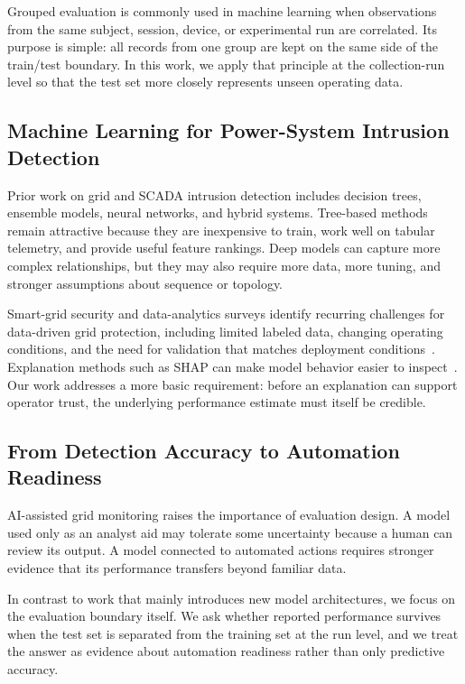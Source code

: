\documentclass[conference,a4paper]{IEEEtran}
\begin{document}
Grouped evaluation is commonly used in machine learning when observations from the same subject, session, device, or experimental run are correlated. Its purpose is simple: all records from one group are kept on the same side of the train/test boundary. In this work, we apply that principle at the collection-run level so that the test set more closely represents unseen operating data.

\subsection{Machine Learning for Power-System Intrusion Detection}

Prior work on grid and SCADA intrusion detection includes decision trees, ensemble models, neural networks, and hybrid systems. Tree-based methods remain attractive because they are inexpensive to train, work well on tabular telemetry, and provide useful feature rankings. Deep models can capture more complex relationships, but they may also require more data, more tuning, and stronger assumptions about sequence or topology.

Smart-grid security and data-analytics surveys identify recurring challenges for data-driven grid protection, including limited labeled data, changing operating conditions, and the need for validation that matches deployment conditions~\cite{tan2017survey,wang2019deep}. Explanation methods such as SHAP can make model behavior easier to inspect~\cite{lundberg2017shap}. Our work addresses a more basic requirement: before an explanation can support operator trust, the underlying performance estimate must itself be credible.

\subsection{From Detection Accuracy to Automation Readiness}

AI-assisted grid monitoring raises the importance of evaluation design. A model used only as an analyst aid may tolerate some uncertainty because a human can review its output. A model connected to automated actions requires stronger evidence that its performance transfers beyond familiar data.

In contrast to work that mainly introduces new model architectures, we focus on the evaluation boundary itself. We ask whether reported performance survives when the test set is separated from the training set at the run level, and we treat the answer as evidence about automation readiness rather than only predictive accuracy.
\end{document}
